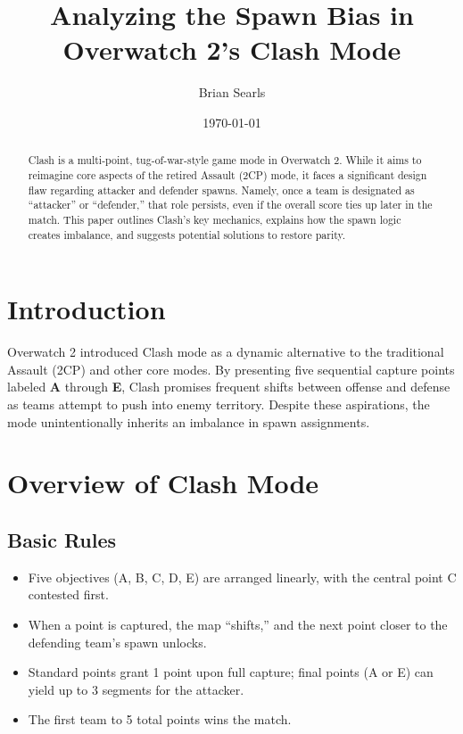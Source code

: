 \documentclass[12pt]{article}
\title{\textbf{Analyzing the Spawn Bias in Overwatch 2's Clash Mode}}
\author{Brian Searls}
\date{\today}
\begin{document}
\maketitle

\begin{abstract}
Clash is a multi-point, tug-of-war-style game mode in Overwatch 2. 
While it aims to reimagine core aspects of the retired Assault (2CP) mode, 
it faces a significant design flaw regarding attacker and defender spawns. 
Namely, once a team is designated as ``attacker'' or ``defender,'' 
that role persists, even if the overall score ties up later in the match. 
This paper outlines Clash’s key mechanics, explains how the spawn logic 
creates imbalance, and suggests potential solutions to restore parity.
\end{abstract}

\tableofcontents

\section{Introduction}
Overwatch 2 introduced Clash mode as a dynamic alternative to the traditional Assault 
(2CP) and other core modes. By presenting five sequential capture points labeled 
\textbf{A} through \textbf{E}, Clash promises frequent shifts between offense and defense 
as teams attempt to push into enemy territory. Despite these aspirations, the mode 
unintentionally inherits an imbalance in spawn assignments.

\section{Overview of Clash Mode}

\subsection{Basic Rules}
\begin{itemize}
    \item Five objectives (A, B, C, D, E) are arranged linearly, with the central point C 
    contested first.
    \item When a point is captured, the map “shifts,” and the next point closer to the 
    defending team's spawn unlocks.
    \item Standard points grant 1 point upon full capture; final points (A or E) can 
    yield up to 3 segments for the attacker.
    \item The first team to 5 total points wins the match.
\end{itemize}
\end{document}
